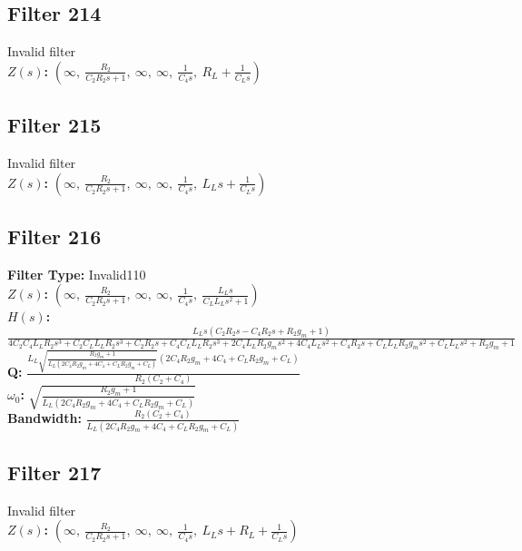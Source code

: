 \documentclass{article}
\begin{document}
\subsection*{Filter 214}
Invalid filter \\ 
\textbf{$Z(s)$:} $\left( \infty, \  \frac{R_{2}}{C_{2} R_{2} s + 1}, \  \infty, \  \infty, \  \frac{1}{C_{4} s}, \  R_{L} + \frac{1}{C_{L} s}\right)$ \\ 
\subsection*{Filter 215}
Invalid filter \\ 
\textbf{$Z(s)$:} $\left( \infty, \  \frac{R_{2}}{C_{2} R_{2} s + 1}, \  \infty, \  \infty, \  \frac{1}{C_{4} s}, \  L_{L} s + \frac{1}{C_{L} s}\right)$ \\ 
\subsection*{Filter 216}
\textbf{Filter Type:} Invalid110 \\ 
\textbf{$Z(s)$:} $\left( \infty, \  \frac{R_{2}}{C_{2} R_{2} s + 1}, \  \infty, \  \infty, \  \frac{1}{C_{4} s}, \  \frac{L_{L} s}{C_{L} L_{L} s^{2} + 1}\right)$ \\ 
\textbf{$H(s)$:} $\frac{L_{L} s \left(C_{2} R_{2} s - C_{4} R_{2} s + R_{2} g_{m} + 1\right)}{4 C_{2} C_{4} L_{L} R_{2} s^{3} + C_{2} C_{L} L_{L} R_{2} s^{3} + C_{2} R_{2} s + C_{4} C_{L} L_{L} R_{2} s^{3} + 2 C_{4} L_{L} R_{2} g_{m} s^{2} + 4 C_{4} L_{L} s^{2} + C_{4} R_{2} s + C_{L} L_{L} R_{2} g_{m} s^{2} + C_{L} L_{L} s^{2} + R_{2} g_{m} + 1}$ \\ 
\textbf{Q:} $\frac{L_{L} \sqrt{\frac{R_{2} g_{m} + 1}{L_{L} \left(2 C_{4} R_{2} g_{m} + 4 C_{4} + C_{L} R_{2} g_{m} + C_{L}\right)}} \left(2 C_{4} R_{2} g_{m} + 4 C_{4} + C_{L} R_{2} g_{m} + C_{L}\right)}{R_{2} \left(C_{2} + C_{4}\right)}$ \\ 
\textbf{$\omega_0$:} $\sqrt{\frac{R_{2} g_{m} + 1}{L_{L} \left(2 C_{4} R_{2} g_{m} + 4 C_{4} + C_{L} R_{2} g_{m} + C_{L}\right)}}$ \\ 
\textbf{Bandwidth:} $\frac{R_{2} \left(C_{2} + C_{4}\right)}{L_{L} \left(2 C_{4} R_{2} g_{m} + 4 C_{4} + C_{L} R_{2} g_{m} + C_{L}\right)}$ \\ 
\subsection*{Filter 217}
Invalid filter \\ 
\textbf{$Z(s)$:} $\left( \infty, \  \frac{R_{2}}{C_{2} R_{2} s + 1}, \  \infty, \  \infty, \  \frac{1}{C_{4} s}, \  L_{L} s + R_{L} + \frac{1}{C_{L} s}\right)$ \\ 
\end{document}
